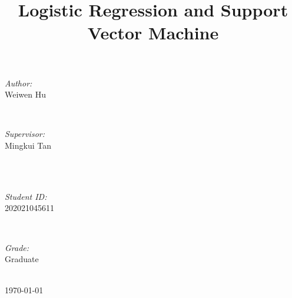 \documentclass[journal, a4paper]{IEEEtran}
\begin{document}
\begin{titlepage}
\begin{minipage}{0.4\textwidth}
\begin{flushleft} \large
\emph{Author:}\\
Weiwen Hu
\end{flushleft}
\end{minipage}
~
\begin{minipage}{0.4\textwidth}
\begin{flushright} \large
\emph{Supervisor:} \\
Mingkui Tan
\end{flushright}
\end{minipage}\\[2cm]
~
\begin{minipage}{0.4\textwidth}
\begin{flushleft} \large
\emph{Student ID:}\\
202021045611
\end{flushleft}
\end{minipage}
~
\begin{minipage}{0.4\textwidth}
\begin{flushright} \large
\emph{Grade:} \\
Graduate
\end{flushright}
\end{minipage}\\[2cm]



{\large \today}\\[2cm] %



\vfill %

\end{titlepage}

	\title{Logistic Regression and Support Vector Machine}
	\maketitle
\end{document}
